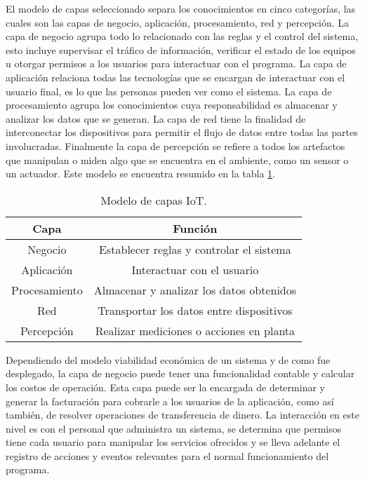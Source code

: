 El modelo de capas seleccionado separa los conocimientos en cinco categorías, las cuales son las capas de negocio, aplicación, procesamiento, red y percepción.
La capa de negocio agrupa todo lo relacionado con las reglas y el control del sistema, esto incluye supervisar el tráfico de información, verificar el estado de los equipos u otorgar permisos a los usuarios para interactuar con el programa.
La capa de aplicación relaciona todas las tecnologías que se encargan de interactuar con el usuario final, es lo que las personas pueden ver como el sistema.
La capa de procesamiento agrupa los conocimientos cuya responsabilidad es almacenar y analizar los datos que se generan.
La capa de red tiene la finalidad de interconectar los dispositivos para permitir el flujo de datos entre todas las partes involucradas.
Finalmente la capa de percepción se refiere a todos los artefactos que manipulan o miden algo que se encuentra en el ambiente, como un sensor o un actuador. Este modelo se encuentra resumido en la tabla \ref{tab:modeloCapas}.

\begin{table}[h]
	\centering
	\begin{tabular}{c|c}
		Capa          & Función                                  \\ \hline
		Negocio       & Establecer reglas y controlar el sistema \\
		Aplicación    & Interactuar con el usuario               \\
		Procesamiento & Almacenar y analizar los datos obtenidos \\
		Red           & Transportar los datos entre dispositivos \\
		Percepción    & Realizar mediciones o acciones en planta \\
	\end{tabular}
	\caption{\label{tab:modeloCapas}Modelo de capas IoT.}
\end{table}

Dependiendo del modelo viabilidad económica de un sistema y de como fue desplegado, la capa de negocio puede tener una funcionalidad contable y calcular los costos de operación.
Esta capa puede ser la encargada de determinar y generar la facturación para cobrarle a los usuarios de la aplicación, como así también, de resolver operaciones de transferencia de dinero. La interacción en este nivel es con el personal que administra un sistema, se determina que permisos tiene cada usuario para manipular los servicios ofrecidos y se lleva adelante el registro de acciones y eventos relevantes para el normal funcionamiento del programa.

